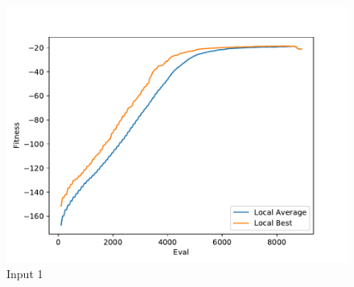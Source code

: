 \documentclass{standalone}
\begin{document}
\begin{figure}[!htb]
	\caption{Input 1}
	\label{fig:graph_1076}
	\includegraphics[width=\textwidth]{../graphs/graphs/1076.pdf}
\end{figure}
\end{document}

